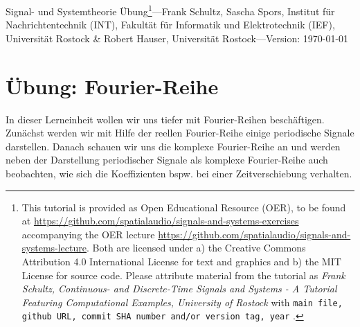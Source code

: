 \documentclass[11pt,a4paper,DIV=12]{scrartcl}
\begin{document}
\noindent Signal- und Systemtheorie Übung\footnote{This tutorial is provided as
Open Educational Resource (OER), to be found at
\url{https://github.com/spatialaudio/signals-and-systems-exercises}
accompanying the OER lecture
\url{https://github.com/spatialaudio/signals-and-systems-lecture}.
%
Both are licensed under a) the Creative Commons Attribution 4.0 International
License for text and graphics and b) the MIT License for source code.
%
Please attribute material from the tutorial as \textit{Frank Schultz,
Continuous- and Discrete-Time Signals and Systems - A Tutorial Featuring
Computational Examples, University of Rostock} with
\texttt{main file, github URL, commit SHA number and/or version tag, year}
.}---Frank Schultz, Sascha Spors,
Institut für Nachrichtentechnik (INT),
Fakultät für Informatik und Elektrotechnik (IEF),
Universität Rostock \&
Robert Hauser, Universität Rostock---Version: \today

\section*{Übung: Fourier-Reihe}
\begin{Ziel}
	In dieser Lerneinheit wollen wir uns tiefer mit Fourier-Reihen beschäftigen. Zunächst werden wir mit Hilfe der reellen Fourier-Reihe einige periodische Signale darstellen. Danach schauen wir uns die komplexe Fourier-Reihe an und werden neben der Darstellung periodischer Signale als komplexe Fourier-Reihe auch beobachten, wie sich die Koeffizienten bspw. bei einer Zeitverschiebung verhalten.
\end{Ziel}
\end{document}
